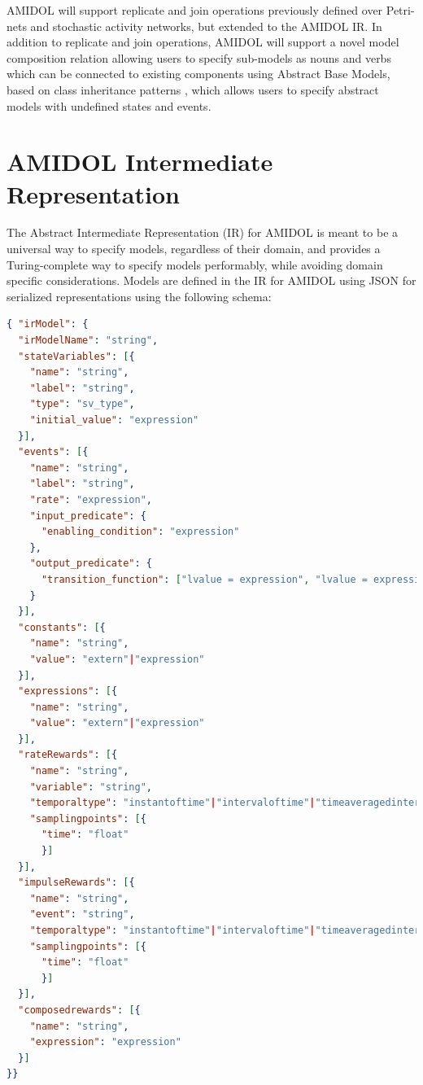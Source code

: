 \documentclass[11pt]{article}
\newcommand{\amidol}{\textsc{AMIDOL}}
\begin{document}
\amidol{} will support replicate and join operations previously defined over Petri-nets and stochastic activity networks, but extended to the \amidol{} IR. \cite{sanders1995ultrasan}  In addition to replicate and join operations, \amidol{} will support a novel model composition relation allowing users to specify sub-models as nouns and verbs which can be connected to existing components using Abstract Base Models, based on class inheritance patterns \cite{bruce2002foundations}, which allows users to specify abstract models with undefined states and events.

\section{\amidol{} Intermediate Representation}

The Abstract Intermediate Representation (IR) for \amidol{} is meant to be a universal way to specify models, regardless of their domain, and provides a Turing-complete way to specify models performably, while avoiding domain specific considerations.  Models are defined in the IR for \amidol{} using JSON for serialized representations using the following schema:

\begin{lstlisting}[language=json, caption=JSON Schema for the AMIDOL Intermediate Representation]
{ "irModel": {
  "irModelName": "string",
  "stateVariables": [{
    "name": "string",
    "label": "string",
    "type": "sv_type",
    "initial_value": "expression"
  }],
  "events": [{
    "name": "string",
    "label": "string",
    "rate": "expression",
    "input_predicate": {
      "enabling_condition": "expression"
    },
    "output_predicate": {
      "transition_function": ["lvalue = expression", "lvalue = expression", ...]
    }
  }],
  "constants": [{
    "name": "string",
    "value": "extern"|"expression"
  }],
  "expressions": [{
    "name": "string",
    "value": "extern"|"expression"
  }],
  "rateRewards": [{
    "name": "string",
    "variable": "string",
    "temporaltype": "instantoftime"|"intervaloftime"|"timeaveragedintervaloftime"|"steadystate",
    "samplingpoints": [{
      "time": "float"
      }]    
  }],
  "impulseRewards": [{
    "name": "string",
    "event": "string",
    "temporaltype": "instantoftime"|"intervaloftime"|"timeaveragedintervaloftime"|"steadystate",
    "samplingpoints": [{
      "time": "float"
      }]    
  }],
  "composedrewards": [{
    "name": "string",
    "expression": "expression"
  }]
}}
\end{lstlisting}
\end{document}

